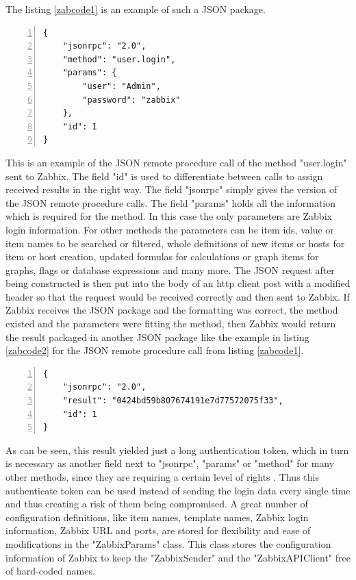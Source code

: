 The listing \ref{zabcode1} is an example of such a JSON package.
\begin{lstlisting}[language=json_sw,caption={JSON authentication request\cite{zab3}},captionpos=b,numbers=left,label=zabcode1]
{
    "jsonrpc": "2.0",
    "method": "user.login",
    "params": {
        "user": "Admin",
        "password": "zabbix"
    },
    "id": 1
}\end{lstlisting} 
	This is an example of the JSON remote procedure call of the method "user.login" sent to Zabbix. The field "id" is used to differentiate between calls to assign received results in the right way. The field "jsonrpc" simply gives the version of the JSON remote procedure calls. The field "params" holds all the information which is required for the method. In this case the only parameters are Zabbix login information. For other methods the parameters can be item ids, value or item names to be searched or filtered, whole definitions of new items or hosts for item or host creation, updated formulas for calculations or graph items for graphs, flags or database expressions and many more. The JSON request after being constructed is then put into the body of an http client post with a modified header so that the request would be received correctly and then sent to Zabbix. If Zabbix receives the JSON package and the formatting was correct, the method existed and the parameters were fitting the method, then Zabbix would return the result packaged in another JSON package like the example in listing \ref{zabcode2} for the JSON remote procedure call from listing \ref{zabcode1}.
	\begin{lstlisting}[language=json_sw,caption={JSON authentication response\cite{zab3}},captionpos=b,numbers=left,label=zabcode2]
{
    "jsonrpc": "2.0",
    "result": "0424bd59b807674191e7d77572075f33",
    "id": 1
}
\end{lstlisting}
	As can be seen, this result yielded just a long authentication token, which in turn is necessary as another field next to "jsonrpc", "params" or "method" for many other methods, since they are requiring a certain level of rights \cite{zab3}. Thus this authenticate token can be used instead of sending the login data every single time and thus creating a risk of them being compromised.
	A great number of configuration definitions, like item names, template names, Zabbix login information, Zabbix URL and ports, are stored for flexibility and ease of modifications in the "ZabbixParams" class. This class stores the configuration information of Zabbix to keep the "ZabbixSender" and the "ZabbixAPIClient" free of hard-coded names.
